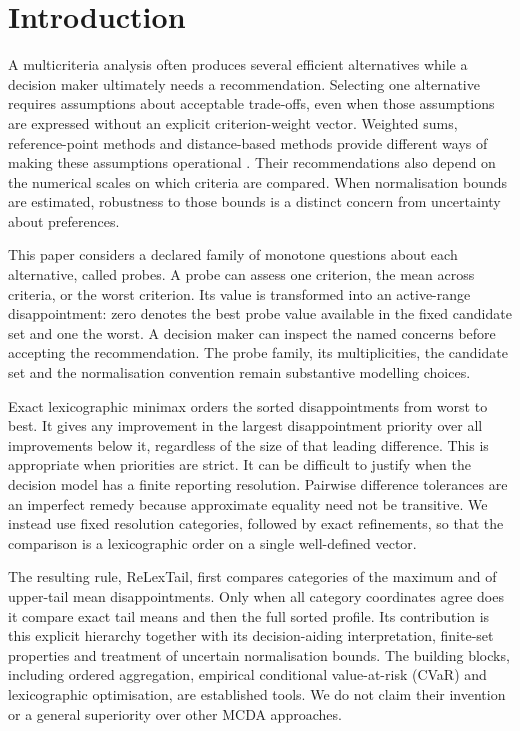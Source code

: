 \section{Introduction}
\label{sec:intro}
A multicriteria analysis often produces several efficient alternatives while a decision maker ultimately needs a recommendation. Selecting one alternative requires assumptions about acceptable trade-offs, even when those assumptions are expressed without an explicit criterion-weight vector. Weighted sums, reference-point methods and distance-based methods provide different ways of making these assumptions operational \citep{hwang1981,wierzbicki1980,miettinen1999}. Their recommendations also depend on the numerical scales on which criteria are compared. When normalisation bounds are estimated, robustness to those bounds is a distinct concern from uncertainty about preferences.

This paper considers a declared family of monotone questions about each alternative, called probes. A probe can assess one criterion, the mean across criteria, or the worst criterion. Its value is transformed into an active-range disappointment: zero denotes the best probe value available in the fixed candidate set and one the worst. A decision maker can inspect the named concerns before accepting the recommendation. The probe family, its multiplicities, the candidate set and the normalisation convention remain substantive modelling choices.

Exact lexicographic minimax orders the sorted disappointments from worst to best. It gives any improvement in the largest disappointment priority over all improvements below it, regardless of the size of that leading difference. This is appropriate when priorities are strict. It can be difficult to justify when the decision model has a finite reporting resolution. Pairwise difference tolerances are an imperfect remedy because approximate equality need not be transitive. We instead use fixed resolution categories, followed by exact refinements, so that the comparison is a lexicographic order on a single well-defined vector.

The resulting rule, ReLexTail, first compares categories of the maximum and of upper-tail mean disappointments. Only when all category coordinates agree does it compare exact tail means and then the full sorted profile. Its contribution is this explicit hierarchy together with its decision-aiding interpretation, finite-set properties and treatment of uncertain normalisation bounds. The building blocks, including ordered aggregation, empirical conditional value-at-risk (CVaR) and lexicographic optimisation, are established tools. We do not claim their invention or a general superiority over other MCDA approaches.

